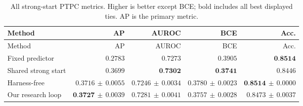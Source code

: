 \begin{longtable}{lrrrr}
\caption{All strong-start PTPC metrics. Higher is better except BCE; bold includes all best displayed ties. AP is the primary metric.}\label{tab:strong-ptpc-all}\\
\toprule Method & AP & AUROC & BCE & Acc. \\\midrule\endfirsthead
\toprule Method & AP & AUROC & BCE & Acc. \\\midrule\endhead
Fixed predictor & $0.2783$ & $0.7273$ & $0.3905$ & $\textbf{0.8514}$ \\
Shared strong start & $0.3699$ & $\textbf{0.7302}$ & $\textbf{0.3741}$ & $0.8446$ \\
Harness-free & $0.3716\,\pm\,0.0055$ & $0.7246\,\pm\,0.0034$ & $0.3780\,\pm\,0.0023$ & $\textbf{0.8514}\,\pm\,0.0000$ \\
Our research loop & $\textbf{0.3727}\,\pm\,0.0039$ & $0.7281\,\pm\,0.0041$ & $0.3757\,\pm\,0.0028$ & $0.8473\,\pm\,0.0037$ \\
\bottomrule\end{longtable}
